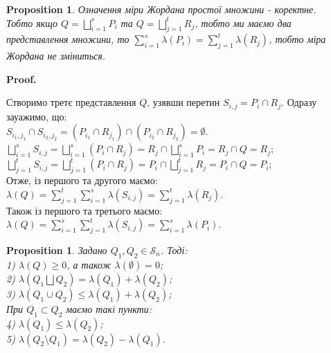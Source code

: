 \documentclass[a4paper, 10pt]{article}
\makeatletter
\def\huge{\displaystyle}
\def\qed{$\blacksquare$}
\theoremstyle{theoremdd}
\theoremstyle{theoremdd}
\theoremstyle{theoremdd}
\theoremstyle{theoremdd}
\theoremstyle{theoremdd}
\newtheorem{proposition}[theorem]{Proposition}
\theoremstyle{theoremdd}
\theoremstyle{theoremdd}
\theoremstyle{theoremdd}
\renewenvironment{proof}[1][Proof.\\]{\par
\pushQED{\hfill \qed}%
\normalfont \topsep6\p@\@plus6\p@\relax
\trivlist
\item\relax
{\bfseries
#1\@addpunct{.}}\hspace\labelsep\ignorespaces
}{%
\popQED\endtrivlist\@endpefalse
}
\makeatother
\begin{document}
\begin{proposition}
Означення міри Жордана простої множини - коректне.\\
Тобто якщо $Q = \huge\bigsqcup_{i=1}^s P_i$ та $Q = \huge\bigsqcup_{j=1}^t R_j$, тобто ми маємо два представлення множини, то $\huge\sum_{i=1}^s \lambda (P_i) = \huge\sum_{j=1}^t \lambda (R_j)$, тобто міра Жордана не зміниться.
\end{proposition}

\begin{proof}
Створимо третє представлення $Q$, узявши перетин $S_{i,j} = P_i \cap R_j$. Одразу зауажимо, що:\\
$S_{i_1,j_1} \cap S_{i_2,j_2} = (P_{i_1} \cap R_{j_1}) \cap (P_{i_2} \cap R_{j_2}) = \emptyset$.\\
$\huge\bigsqcup_{i=1}^s S_{i,j} = \bigsqcup_{i=1}^s (P_i \cap R_j) = R_j \cap \bigsqcup_{i=1}^s P_i = R_j \cap Q = R_j$;\\
$\huge\bigsqcup_{j=1}^t S_{i,j} = \bigsqcup_{j=1}^t (P_i \cap R_j) = P_i \cap \bigsqcup_{j=1}^t R_j = P_i \cap Q = P_i$;\\
Отже, із першого та другого маємо: $\lambda (Q) = \huge\sum_{j=1}^t \sum_{i=1}^s \lambda(S_{i,j}) = \sum_{j=1}^t \lambda(R_j)$.\\
Також із першого та третього маємо: $\lambda (Q) = \huge\sum_{i=1}^s \sum_{j=1}^t \lambda(S_{i,j}) = \sum_{i=1}^s \lambda(P_i)$.
\end{proof}

\begin{proposition}
Задано $Q_1,Q_2 \in \mathcal{S}_n$. Тоді:\\
1) $\lambda(Q) \geq 0$, а також $\lambda(\emptyset) = 0$;\\
2) $\lambda(Q_1 \bigsqcup Q_2) = \lambda(Q_1) + \lambda(Q_2)$;\\
3) $\lambda (Q_1 \cup Q_2) \leq \lambda(Q_1) + \lambda(Q_2)$;\\
При $Q_1 \subset Q_2$ маємо такі пункти:\\
4) $\lambda(Q_1) \leq \lambda(Q_2)$;\\
5) $\lambda(Q_2 \setminus Q_1) = \lambda(Q_2) - \lambda(Q_1)$.
\end{proposition}
\end{document}
